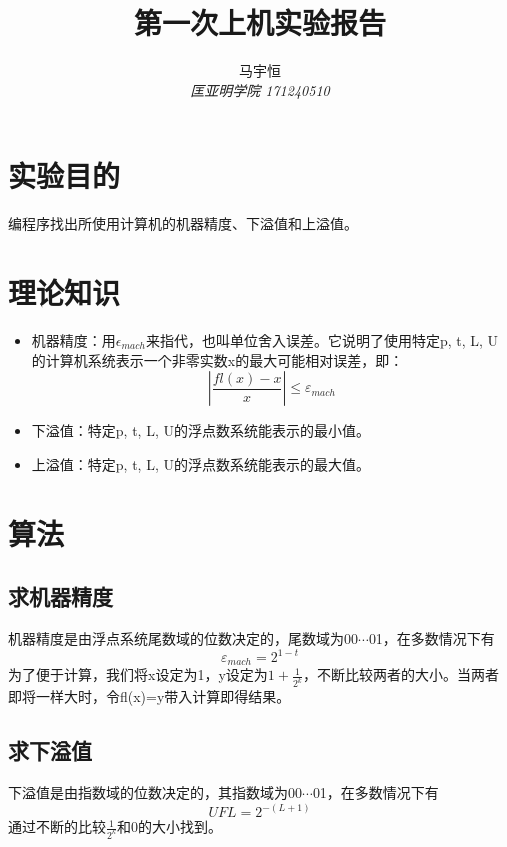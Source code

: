\documentclass[a4paper,11pt,onecolumn,twoside]{article}
\title{\textbf{第一次上机实验报告}}
\author{
马宇恒
\\[2pt]
{\small \textit{匡亚明学院 171240510}}}
\date{}
\begin{document}
\maketitle
\thispagestyle{firststyle}
\setlength{\oddsidemargin}{ 1cm}
\setlength{\evensidemargin}{\oddsidemargin}
\setlength{\textwidth}{15.50cm}
\vspace{-.8cm}


\setcounter{page}{1}

\setlength{\oddsidemargin}{-.5cm}  %
\setlength{\evensidemargin}{\oddsidemargin}
\setlength{\textwidth}{17.00cm}

\section{实验目的}
编程序找出所使用计算机的机器精度、下溢值和上溢值。

\section{理论知识}
\begin{itemize}
    \item 机器精度：用$\epsilon_{mach}$来指代，也叫单位舍入误差。它说明了使用特定p, t, L, U的计算机系统表示一个非零实数x的最大可能相对误差，即：$$\left| \frac { f l ( x ) - x } { x } \right| \leq \varepsilon _ { m a c h }$$
    \item 下溢值：特定p, t, L, U的浮点数系统能表示的最小值。
    \item 上溢值：特定p, t, L, U的浮点数系统能表示的最大值。
\end{itemize}

\section{算法}
\subsection{求机器精度}
机器精度是由浮点系统尾数域的位数决定的，尾数域为00$\cdots$01，在多数情况下有$$\varepsilon_{mach}=2^{1-t}$$为了便于计算，我们将x设定为1，y设定为$1+\frac{1}{2^{k}}$，不断比较两者的大小。当两者即将一样大时，令fl(x)=y带入计算即得结果。
\subsection{求下溢值}
下溢值是由指数域的位数决定的，其指数域为00$\cdots$01，在多数情况下有$$UFL=2^{-(L+1)}$$通过不断的比较$\frac{1}{2^{k}}$和0的大小找到。
\end{document}
